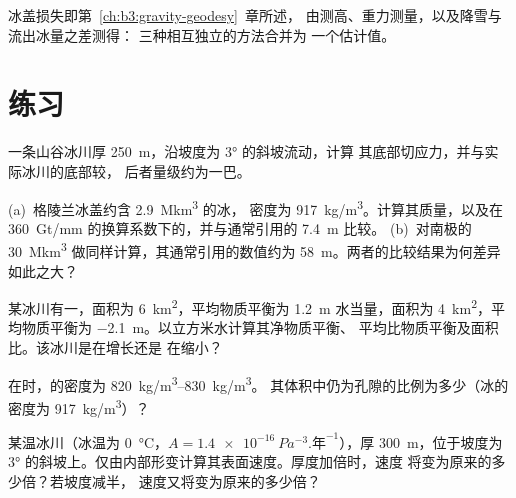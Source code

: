冰盖损失即第~\ref{ch:b3:gravity-geodesy}~章所述，
由测高、重力测量，以及降雪与流出冰量之差测得：
三种相互独立的方法合并为
一个估计值。

\section{练习}

\begin{exercise}[$\star$]\label{exo:b3:glaciology:1}
一条山谷冰川厚 \qty{250}{m}，沿坡度为 \ang{3} 的斜坡流动，计算
其底部切应力，并与实际冰川的底部较，
后者量级约为一巴。
\end{exercise}

\begin{exercise}[$\star$]\label{exo:b3:glaciology:2}
(a)~格陵兰冰盖约含 \qty{2.9}{\mega km^3} 的冰，
密度为 \qty{917}{kg/m^3}。计算其质量，以及在
\qty{360}{Gt/mm} 的换算系数下的，并与通常引用的 \qty{7.4}{m} 比较。
(b)~对南极的 \qty{30}{\mega km^3} 做同样计算，其通常引用的数值约为
\qty{58}{m}。两者的比较结果为何差异如此之大？
\end{exercise}

\begin{exercise}[$\star$]\label{exo:b3:glaciology:3}
某冰川有一，面积为 \qty{6}{km^2}，平均物质平衡为
\qty{+1.2}{m} 水当量，面积为 \qty{4}{km^2}，平均物质平衡为
\qty{-2.1}{m}。以立方米水计算其净物质平衡、
平均比物质平衡及面积比。该冰川是在增长还是
在缩小？
\end{exercise}

\begin{exercise}[$\star$]\label{exo:b3:glaciology:4}
在时，的密度为 \qtyrange{820}{830}{kg/m^3}。
其体积中仍为孔隙的比例为多少（冰的
密度为 \qty{917}{kg/m^3}）？
\end{exercise}

\begin{exercise}[$\star\star$]\label{exo:b3:glaciology:5}
某温冰川（冰温为 \qty{0}{\celsius}，$A =
\qty{1.4e-16}{Pa^{-3}.\text{年}^{-1}}$），厚 \qty{300}{m}，位于坡度为
\ang{3} 的斜坡上。仅由内部形变计算其表面速度。厚度加倍时，速度
将变为原来的多少倍？若坡度减半，
速度又将变为原来的多少倍？
\end{exercise}

